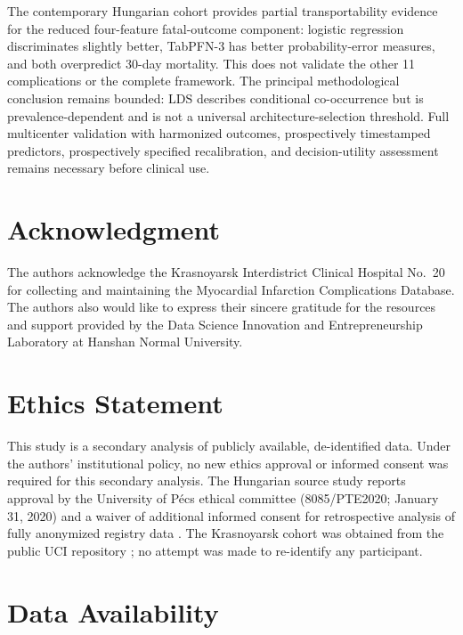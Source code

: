 \documentclass{ieeeaccess}
\begin{document}
The contemporary Hungarian cohort provides partial transportability evidence for the reduced four-feature fatal-outcome component: logistic regression discriminates slightly better, TabPFN-3 has better probability-error measures, and both overpredict 30-day mortality. This does not validate the other 11 complications or the complete framework. The principal methodological conclusion remains bounded: $\mathrm{LDS}$ describes conditional co-occurrence but is prevalence-dependent and is not a universal architecture-selection threshold. Full multicenter validation with harmonized outcomes, prospectively timestamped predictors, prospectively specified recalibration, and decision-utility assessment remains necessary before clinical use.

\clearpage
\onecolumn

\clearpage
\twocolumn

\section*{Acknowledgment}

The authors acknowledge the Krasnoyarsk Interdistrict Clinical Hospital No.~20 for collecting and maintaining the Myocardial Infarction Complications Database. The authors also would like to express their sincere gratitude for the resources and support provided by the Data Science Innovation and Entrepreneurship Laboratory at Hanshan Normal University.

\section*{Ethics Statement}

This study is a secondary analysis of publicly available, de-identified data. Under the authors' institutional policy, no new ethics approval or informed consent was required for this secondary analysis. The Hungarian source study reports approval by the University of P\'ecs ethical committee (8085/PTE2020; January 31, 2020) and a waiver of additional informed consent for retrospective analysis of fully anonymized registry data \cite{balint2026}. The Krasnoyarsk cohort was obtained from the public UCI repository \cite{uci2020}; no attempt was made to re-identify any participant.

\section*{Data Availability}
\end{document}
